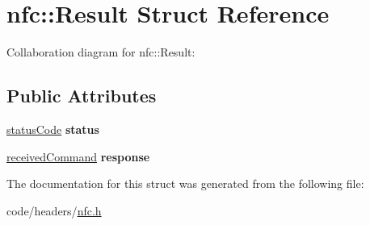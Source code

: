 \hypertarget{structnfc_1_1Result}{}\section{nfc\+:\+:Result Struct Reference}
\label{structnfc_1_1Result}


Collaboration diagram for nfc\+:\+:Result\+:
\subsection*{Public Attributes}
\begin{DoxyCompactItemize}
\item 
\mbox{\label{structnfc_1_1Result_a8d150a810d68d7a2de594d149f279711}} 
\hyperlink{declarations_8h_ae1d20c5a38cae82ccaa6a77be3fd264b}{status\+Code} {\bfseries status}
\item 
\mbox{\label{structnfc_1_1Result_a31e3829c8d169280747b08b9b67cc178}} 
\hyperlink{classreceivedCommand}{received\+Command} {\bfseries response}
\end{DoxyCompactItemize}


The documentation for this struct was generated from the following file\+:\begin{DoxyCompactItemize}
\item 
code/headers/\hyperlink{nfc_8h}{nfc.\+h}\end{DoxyCompactItemize}
